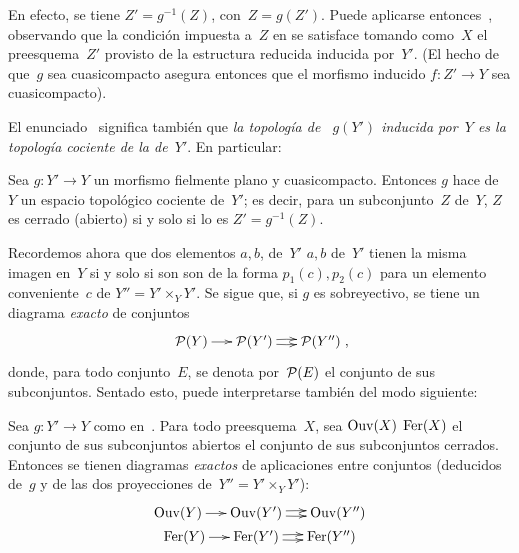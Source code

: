 {\enlargethispage{.5cm}}%
En efecto, se tiene $Z'=g^{-1}(Z)$, con~$Z=g(Z')$. Puede aplicarse
entonces~, observando que la condición impuesta a~$Z$ en
 se satisface tomando como~$X$ el preesquema~$Z'$ provisto de
la estructura reducida inducida por~$Y'$. (El hecho de que~$g$ sea
cuasicompacto asegura entonces que el morfismo inducido
$f\colon Z'\to Y$ sea cuasicompacto).

El enunciado~ significa también que \emph{la topología de
~$g(Y')$ inducida por~$Y$ es la topología cociente de la de~$Y'$}. En
particular:

\begin{corollaire}
\label{VIII.4.3}
Sea $g\colon Y'\to Y$ un morfismo fielmente plano y cuasicompacto. Entonces
$g$ hace de~$Y$ un espacio topológico cociente de~$Y'$; es decir, para un
subconjunto~$Z$ de~$Y$, $Z$ es cerrado (\resp abierto) si y solo si lo es
$Z'=g^{-1}(Z)$.
\end{corollaire}

Recordemos ahora que dos elementos
{$a,b$, de~$Y'$}
{$a,b$ de~$Y'$}
tienen la misma imagen en~$Y$ si y solo si
{son}
{son}
de la forma $p_{1}(c),p_{2}(c)$ para un elemento conveniente~$c$ de
$Y''=Y'\times_{Y}Y'$. Se sigue que, si $g$ es sobreyectivo, se tiene un
diagrama \emph{exacto} de conjuntos
$$
\xymatrix@C=.5cm{\cal{P}(Y)\ar[r] & \cal{P}(Y')\ar@/^2pt/[r]\ar@/_2pt/[r] &
\cal{P}(Y'')}\quoi,
$$
donde, para todo conjunto~$E$, se denota por~$\cal{P}(E)$ el conjunto de
sus subconjuntos. Sentado esto,  puede interpretarse también
del modo siguiente:

\begin{corollaire}
\label{VIII.4.4}
Sea
%
%
$g\colon Y'{\to} Y$ como en~. Para todo preesquema~$X$, sea
$\Ouv(X)$ \resp $\Fer(X)$ el conjunto de sus subconjuntos abiertos \resp
el conjunto de sus subconjuntos cerrados. Entonces se tienen diagramas
\emph{exactos} de aplicaciones entre conjuntos (deducidos de~$g$ y de las
dos proyecciones de~$Y''=Y'\times_{Y}Y'$):
\vspace*{-5pt}
\begin{gather*}
\xymatrix@C=.5cm{\Ouv(Y)\ar[r] & \Ouv(Y')\ar@/^2pt/[r]\ar@/_2pt/[r] &
\Ouv(Y'')}\\[-3pt]
\xymatrix@C=.5cm{\Fer(Y)\ar[r] & \Fer(Y')\ar@/^2pt/[r]\ar@/_2pt/[r] &
\Fer(Y'')}
\end{gather*}
\end{corollaire}

